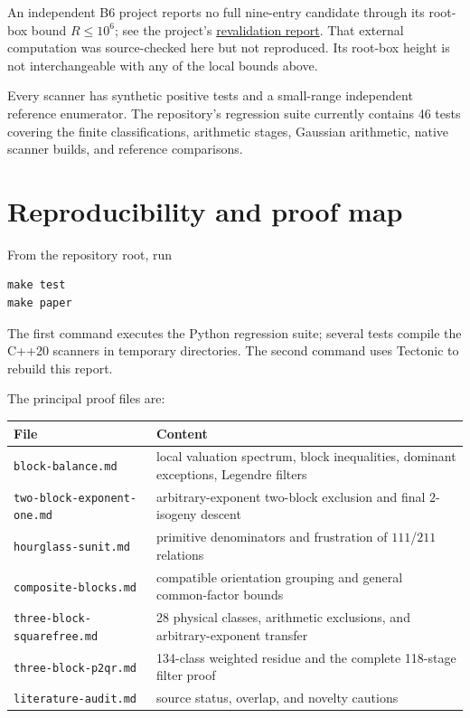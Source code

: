 \documentclass[11pt]{article}
\theoremstyle{definition}
\theoremstyle{remark}
\begin{document}
An independent B6 project reports no full nine-entry candidate through its
root-box bound $R\le10^6$; see the project's
\href{https://github.com/mystimath/magic-square-of-squares-3x3/blob/main/docs/40-b4-b6-publication-revalidation-2026-07-21.md}{revalidation report}.
That external computation was source-checked here but not reproduced.  Its
root-box height is not interchangeable with any of the local bounds above.

Every scanner has synthetic positive tests and a small-range independent
reference enumerator.  The repository's regression suite currently contains
46 tests covering the finite classifications, arithmetic stages, Gaussian
arithmetic, native scanner builds, and reference comparisons.

\section{Reproducibility and proof map}

From the repository root, run
\begin{verbatim}
make test
make paper
\end{verbatim}
The first command executes the Python regression suite; several tests compile
the C++20 scanners in temporary directories.  The second command uses Tectonic
to rebuild this report.

The principal proof files are:
\begin{center}
\begin{tabular}{@{}p{}p{}@{}}
\toprule
File & Content \\
\midrule
\texttt{block-balance.md} & local valuation spectrum, block inequalities,
dominant exceptions, Legendre filters \\
\texttt{two-block-exponent-one.md} & arbitrary-exponent two-block exclusion
and final $2$-isogeny descent \\
\texttt{hourglass-sunit.md} & primitive denominators and frustration of
$111$/$211$ relations \\
\texttt{composite-blocks.md} & compatible orientation grouping and general
common-factor bounds \\
\texttt{three-block-squarefree.md} & 28 physical classes, arithmetic
exclusions, and arbitrary-exponent transfer \\
\texttt{three-block-p2qr.md} & 134-class weighted residue and the complete
118-stage filter proof \\
\texttt{literature-audit.md} & source status, overlap, and novelty cautions \\
\bottomrule
\end{tabular}
\end{center}
\end{document}
